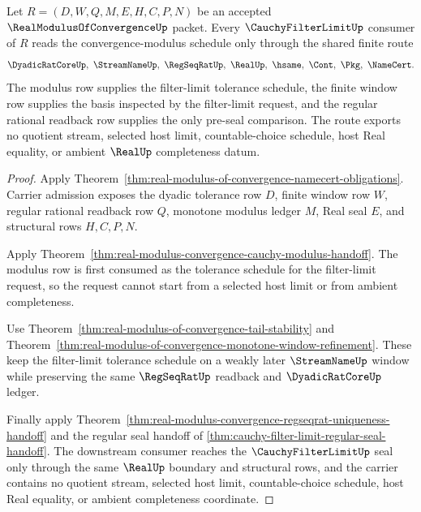 \begin{theorem}
\label{thm:real-modulus-of-convergence-cauchyfilterlimit-route}
Let $R=(D,W,Q,M,E,H,C,P,N)$ be an accepted $\RealModulusOfConvergenceUp$ packet. Every $\CauchyFilterLimitUp$ consumer of $R$ reads the convergence-modulus schedule only through the shared finite route
$$
\DyadicRatCoreUp,\ \StreamNameUp,\ \RegSeqRatUp,\ \RealUp,\ \hsame,\ \Cont,\ \Pkg,\ \NameCert .
$$
The modulus row supplies the filter-limit tolerance schedule, the finite window row supplies the basis inspected by the filter-limit request, and the regular rational readback row supplies the only pre-seal comparison. The route exports no quotient stream, selected host limit, countable-choice schedule, host Real equality, or ambient $\RealUp$ completeness datum.
\end{theorem}
\begin{proof}
Apply Theorem~\ref{thm:real-modulus-of-convergence-namecert-obligations}. Carrier admission exposes the dyadic tolerance row $D$, finite window row $W$, regular rational readback row $Q$, monotone modulus ledger $M$, Real seal $E$, and structural rows $H,C,P,N$.

Apply Theorem~\ref{thm:real-modulus-convergence-cauchy-modulus-handoff}. The modulus row is first consumed as the tolerance schedule for the filter-limit request, so the request cannot start from a selected host limit or from ambient completeness.

Use Theorem~\ref{thm:real-modulus-of-convergence-tail-stability} and Theorem~\ref{thm:real-modulus-of-convergence-monotone-window-refinement}. These keep the filter-limit tolerance schedule on a weakly later $\StreamNameUp$ window while preserving the same $\RegSeqRatUp$ readback and $\DyadicRatCoreUp$ ledger.

Finally apply Theorem~\ref{thm:real-modulus-convergence-regseqrat-uniqueness-handoff} and the regular seal handoff of \autoref{thm:cauchy-filter-limit-regular-seal-handoff}. The downstream consumer reaches the $\CauchyFilterLimitUp$ seal only through the same $\RealUp$ boundary and structural rows, and the carrier contains no quotient stream, selected host limit, countable-choice schedule, host Real equality, or ambient completeness coordinate.
\end{proof}

